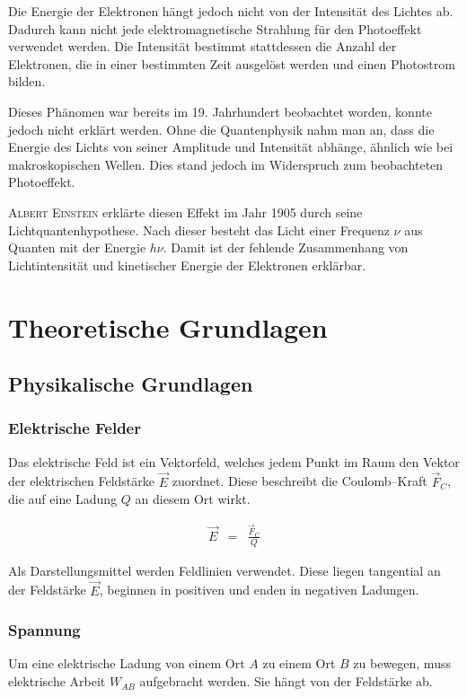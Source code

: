\documentclass[12pt,a4paper]{scrartcl}
\numberwithin{equation}{section} %
\begin{document}
Die Energie der Elektronen hängt jedoch nicht von der Intensität des Lichtes ab. Dadurch kann nicht jede elektromagnetische Strahlung für den Photoeffekt verwendet werden. Die Intensität bestimmt stattdessen die Anzahl der Elektronen, die in einer bestimmten Zeit ausgelöst werden und einen Photostrom bilden.

Dieses Phänomen war bereits im 19. Jahrhundert beobachtet worden, konnte jedoch nicht erklärt werden. Ohne die Quantenphysik nahm man an, dass die Energie des Lichts von seiner Amplitude und Intensität abhänge, ähnlich wie bei makroskopischen Wellen. Dies stand jedoch im Widerspruch zum beobachteten Photoeffekt.

\textsc{Albert Einstein} erklärte diesen Effekt im Jahr 1905 durch seine Lichtquantenhypothese. Nach dieser besteht das Licht einer Frequenz $\nu$ aus Quanten mit der Energie $h\nu$. Damit ist der fehlende Zusammenhang von Lichtintensität und kinetischer Energie der Elektronen erklärbar.

\clearpage
\hypertarget{theoretische-grundlagen}{\section{Theoretische Grundlagen}\label{theoretische-grundlagen}}

\subsection{Physikalische Grundlagen}
\subsubsection{Elektrische Felder}
\label{Elektrische Felder}

Das elektrische Feld ist ein Vektorfeld, welches jedem Punkt im Raum den Vektor der elektrischen Feldstärke $\vec{E}$ zuordnet. Diese beschreibt die Coulomb--Kraft $\vec{F}_C$, die auf eine Ladung $Q$ an diesem Ort wirkt.

\begin{eqnarray}
	\vec{E} &=& \frac{\vec{F}_C}{Q}
\end{eqnarray}

\noindent
Als Darstellungsmittel werden Feldlinien verwendet. Diese liegen tangential an der Feldstärke $\vec{E}$, beginnen in positiven und enden in negativen Ladungen.

\subsubsection{Spannung}
\label{Spannung}
Um eine elektrische Ladung von einem Ort $A$ zu einem Ort $B$ zu bewegen, muss elektrische Arbeit $W_{AB}$ aufgebracht werden. Sie hängt von der Feldstärke ab.
\end{document}
